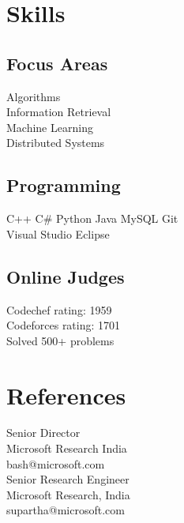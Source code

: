 \documentclass[]{resume-openfont}
\begin{document}
\begin{minipage}[t]{0.25\textwidth}
\section{Skills}
\subsection{Focus Areas}
\textbullet{} Algorithms \\
\textbullet{} Information Retrieval \\
\textbullet{} Machine Learning \\
\textbullet{} Distributed Systems \\
\sectionsep

\subsection{Programming}
C++ \textbullet{}   C\# \textbullet{} Python \textbullet{} Java \textbullet{} MySQL \textbullet{} Git\\
Visual Studio \textbullet{} Eclipse \\

\sectionsep

\subsection{Online Judges}
Codechef rating: 1959 \\
Codeforces rating: 1701 \\
Solved 500+ problems
\sectionsep

\section{References}
Senior Director \\
Microsoft Research India \\
bash@microsoft.com \\

\sectionsep
{}
Senior Research Engineer \\
Microsoft Research, India \\
supartha@microsoft.com

%
%

\end{minipage} 
\end{document}
